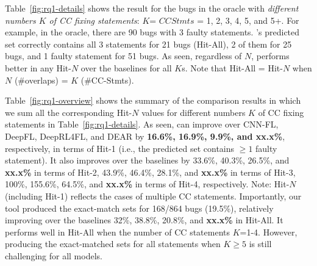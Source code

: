 Table~\ref{fig:rq1-details} shows the result for the bugs
in the oracle with {\em different numbers $K$ of CC fixing
statements}: $K$= $CCStmts$ = 1, 2, 3, 4, 5, and 5+. For example, in
the oracle, there are 90 bugs with 3 faulty statements. {\tool}'s
predicted set correctly contains all 3 statements for 21 bugs
(Hit-All), 2 of them for 25 bugs, and 1 faulty statement for 51
bugs. As seen, regardless of $N$, {\tool} performs better in any
Hit-$N$ over the baselines for all $K$s. Note that Hit-All = Hit-$N$
when $N$ (\#overlaps) = $K$ (\#CC-Stmts).



Table~\ref{fig:rq1-overview} shows the summary of the comparison
results in which we sum all the corresponding Hit-$N$ values for
different numbers $K$ of CC fixing statements in
Table~\ref{fig:rq1-details}.
%
As seen, {\tool} can improve over CNN-FL, DeepFL, DeepRL4FL, and DEAR
by {\bf 16.6\%, 16.9\%, 9.9\%, and xx.x\%}, respectively, in terms of
Hit-1 (i.e., the predicted set contains $\geq 1$ faulty statement).
%
%
It also improves over the baselines by 33.6\%, 40.3\%, 26.5\%,
and {\bf xx.x\%} in terms of Hit-2, 43.9\%, 46.4\%, 28.1\%, and {\bf
xx.x\%} in terms of Hit-3, 100\%, 155.6\%, 64.5\%, and {\bf xx.x\%} in
terms of Hit-4, respectively. Note: Hit-$N$ (including Hit-1) reflects
the cases of multiple CC statements.
%
Importantly, our tool produced the exact-match sets for 168/864 bugs
(19.5\%), relatively improving over the baselines 32\%, 38.8\%,
20.8\%, and {\bf xx.x\%} in Hit-All. It performs well in Hit-All
when the number of CC statements $K$=1-4. However, producing the
exact-matched sets for all statements when $K \geq 5$ is still
challenging for all models.


